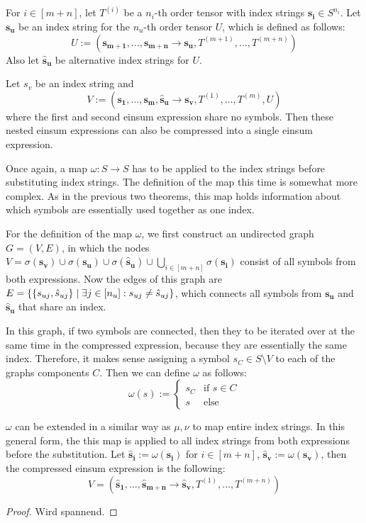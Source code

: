 \begin{theorem}
    \label{thm:nested_einsum:4}
    For $i \in [m + n]$, let $T^{(i)}$ be a $n_i$-th order tensor with index strings $\bm{s_i} \in S^{n_i}$.
    Let $\bm{s_u}$ be an index string for the $n_u$-th order tensor $U$, which is defined as follows:
    $$U := (\bm{s_{m + 1}},\dots,\bm{s_{m + n}} \rightarrow \bm{s_u}, T^{(m + 1)},\dots,T^{(m + n)})$$
    Also let $\bm{\hat{s}_u}$ be alternative index strings for $U$.

    Let $s_v$ be an index string and
    $$V := (\bm{s_1},\dots,\bm{s_m}, \bm{\hat{s}_u} \rightarrow \bm{s_v}, T^{(1)},\dots,T^{(m)}, U)$$
    where the first and second einsum expression share no symbols.
    Then these nested einsum expressions can also be compressed into a single einsum expression.

    Once again, a map $\omega: S \rightarrow S$ has to be applied to the index strings before substituting index strings.
    The definition of the map this time is somewhat more complex.
    As in the previous two theorems, this map holds information about which symbols are essentially used together as one index.

    For the definition of the map $\omega$, we first construct an undirected graph $G = (V, E)$,
    in which the nodes $V = \sigma(\bm{s_v}) \cup \sigma(\bm{s_u}) \cup \sigma(\bm{\hat{s}_u}) \cup \bigcup_{i \in [m + n]} \sigma(\bm{s_i})$ consist of all symbols from both expressions.
    Now the edges of this graph are $E = \lbrace \lbrace s_{uj}, \hat{s}_{uj} \rbrace \mid \exists j \in [n_u]: s_{uj} \neq \hat{s}_{uj} \rbrace$,
    which connects all symbols from $\bm{s_u}$ and $\bm{\hat{s}_u}$ that share an index.

    In this graph, if two symbols are connected, then they to be iterated over at the same time in the compressed expression, because they are essentially the same index.
    Therefore, it makes sense assigning a symbol $s_C \in S \setminus V$ to each of the graphs components $C$.
    Then we can define $\omega$ as follows:
    $$\omega(s) := \begin{cases}
            s_C & \text{if } s \in C \\
            s   & \text{else}
        \end{cases}$$

    $\omega$ can be extended in a similar way as $\mu, \nu$ to map entire index strings.
    In this general form, the this map is applied to all index strings from both expressions before the substitution.
    Let $\bm{\hat{s}_i} := \omega(\bm{s_i})$ for $i \in [m + n]$, $\bm{\hat{s}_v} := \omega(\bm{s_v})$, then the compressed einsum expression is the following:
    $$V = (\bm{\hat{s}_1}, \dots, \bm{\hat{s}_{m + n}} \rightarrow \bm{\hat{s}_v}, T^{(1)},\dots,T^{(m + n)})$$
\end{theorem}
\begin{proof}
    Wird spannend.
\end{proof}
